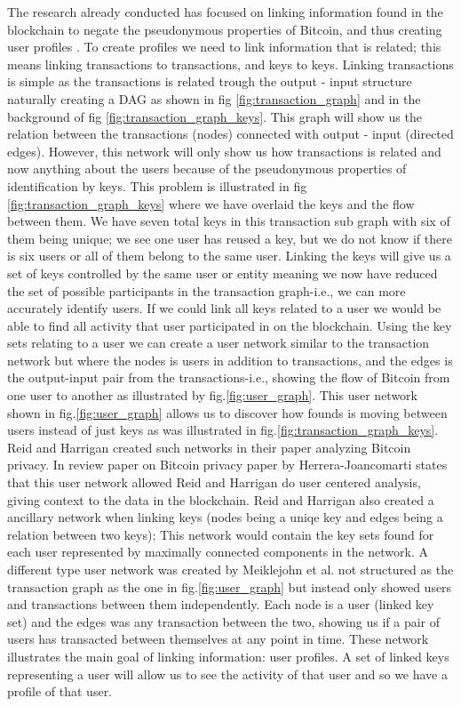 The research already conducted has focused on linking information found in the blockchain to negate the pseudonymous properties of Bitcoin, and thus creating user profiles \cite{meiklejohn2013fistful}\cite{androulaki2013evaluating}\cite{reid2013analysis}\cite{ron2013quantitative}. To create profiles we need to link information that is related; this means linking transactions to transactions, and keys to keys. Linking transactions is simple as the transactions is related trough the output - input structure naturally creating a DAG as shown in fig \ref{fig:transaction_graph} and in the background of fig \ref{fig:transaction_graph_keys}.  This graph will show us the relation between the transactions (nodes) connected with output - input (directed edges). However, this network will only show us how transactions is related and now anything about the users because of the pseudonymous properties of identification by keys. This problem is illustrated in fig \ref{fig:transaction_graph_keys} where we have overlaid the keys and the flow between them. We have seven total keys in this transaction sub graph with six of them being unique; we see one user has reused a key, but we do not know if there is six users or all of them belong to the same user. Linking the keys will give us a set of keys controlled by the same user or entity meaning we now have reduced the set of possible participants in the transaction graph-i.e., we can more accurately identify users. If we could link all keys related to a user we would be able to find all activity that user participated in on the blockchain. Using the key sets relating to a user we can create a user network similar to the transaction network but where the nodes is users in addition to transactions, and the edges is the output-input pair from the transactions-i.e., showing the flow of Bitcoin from one user to another as illustrated by fig.\ref{fig:user_graph}. 
This user network shown in fig.\ref{fig:user_graph} allows us to discover how founds is moving between users instead of just keys as was illustrated in fig.\ref{fig:transaction_graph_keys}. Reid and Harrigan \cite{reid2013analysis} created such networks in their paper analyzing Bitcoin privacy. In review paper on Bitcoin privacy paper by Herrera-Joancomart\́i\cite{herrera2015research} states that this user network allowed Reid and Harrigan do user centered analysis, giving context to the data in the blockchain. Reid and Harrigan also created a ancillary network when linking keys (nodes being a uniqe key and edges being a relation between two keys); This network would contain the key sets found for each user represented by maximally connected components in the network. A different type user network was created by Meiklejohn et al. \cite{meiklejohn2013fistful} not structured as the transaction graph as the one in fig.\ref{fig:user_graph} but instead only showed users and transactions between them independently. Each node is a user (linked key set) and the edges was any transaction between the two, showing us if a pair of users has transacted between themselves at any point in time. These network illustrates the main goal of linking information: user profiles. A set of linked keys representing a user will allow us to see the activity of that user and so we have a profile of that user.
 
